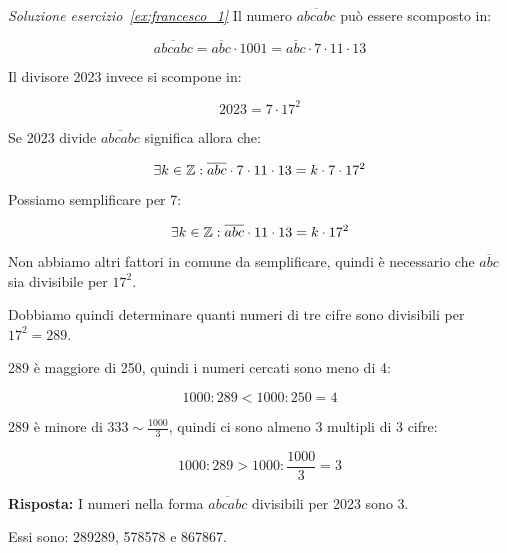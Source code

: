\begin{soluzione}
    \emph{Soluzione esercizio~\ref{ex:francesco_1}}
    Il numero $\overline{abcabc}$ può essere scomposto in:

    \begin{equation*}
        \overline{abcabc} = \overline{abc} \cdot 1001 = \overline{abc} \cdot 7 \cdot 11 \cdot 13
    \end{equation*}

    Il divisore 2023 invece si scompone in:

    \begin{equation*}
        2023 = 7 \cdot 17^2
    \end{equation*}

    Se 2023 divide $\overline{abcabc}$ significa allora che:

    \begin{equation*}
        \exists k \in  \mathbb{Z} : \overline{abc} \cdot 7 \cdot 11 \cdot 13 = k \cdot 7 \cdot 17^2
    \end{equation*}

    Possiamo semplificare per 7:

    \begin{equation*}
        \exists k \in  \mathbb{Z} : \overline{abc} \cdot 11 \cdot 13 = k \cdot 17^2
    \end{equation*}

    Non abbiamo altri fattori in comune da semplificare, quindi è necessario che $\overline{abc}$ sia divisibile per
    $17^2$.

    Dobbiamo quindi determinare quanti numeri di tre cifre sono divisibili per $17^2 = 289$.

    289 è maggiore di 250, quindi i numeri cercati sono meno di 4:

    \begin{equation*}
        1000 : 289 < 1000 : 250 = 4
    \end{equation*}

    289 è minore di $333 \sim \frac{1000}{3}$, quindi ci sono almeno 3 multipli di 3 cifre:

    \begin{equation*}
        1000 : 289 > 1000 : \frac{1000}{3} = 3
    \end{equation*}

    \bigskip
    \textbf{Risposta:}
    I numeri nella forma $\overline{abcabc}$ divisibili per 2023 sono 3.

    Essi sono: 289289, 578578 e 867867.

\end{soluzione}
